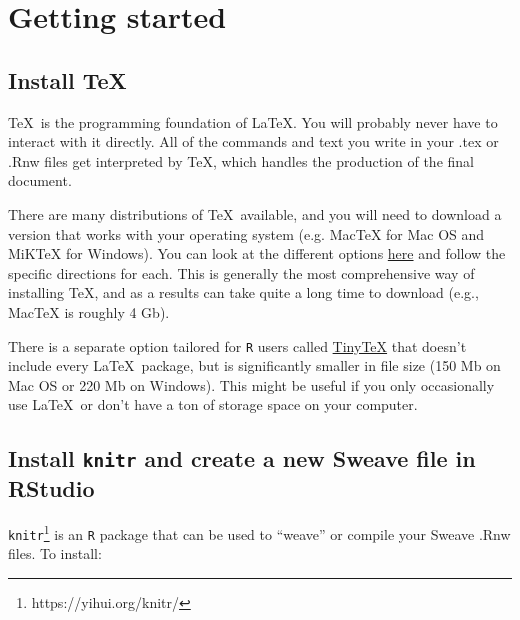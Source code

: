 \documentclass[11pt]{article}\usepackage[]{graphicx}\usepackage[]{color}
\begin{document}
\pagebreak
\section{Getting started}


\subsection{Install \TeX\ }

\TeX\ is the programming foundation of \LaTeX. You will probably never have to interact with it directly. All of the commands and text you write in your .tex or .Rnw files get interpreted by \TeX, which handles the production of the final document. 

There are many distributions of \TeX\ available, and you will need to download a version that works with your operating system (e.g. MacTeX for Mac OS and MiKTeX for Windows). You can look at the different options \href{https://www.latex-project.org/get/}{here} and follow the specific directions for each. This is generally the most comprehensive way of installing \TeX, and as a results can take quite a long time to download (e.g., MacTeX is roughly 4 Gb). 

There is a separate option tailored for \texttt{R} users called \href{https://yihui.org/tinytex/}{TinyTeX} that doesn't include every \LaTeX\ package, but is significantly smaller in file size (150 Mb on Mac OS or 220 Mb on Windows). This might be useful if you only occasionally use \LaTeX\ or don't have a ton of storage space on your computer. 


\subsection{Install \texttt{knitr} and create a new Sweave file in RStudio}

\texttt{knitr}\footnote{https://yihui.org/knitr/} is an \texttt{R} package that can be used to ``weave'' or compile your Sweave .Rnw files. To install:
\end{document}
